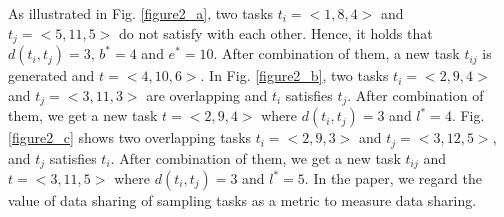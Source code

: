 \documentclass[prodmode,acmtosn]{acmsmall}
\begin{document}
As illustrated in Fig. \ref{figure2_a}, two tasks $t_i\mathrm{=<}1,8,4\mathrm{>}$ and $t_j\mathrm{=<}5,11,5\mathrm{>}$ do not satisfy with each other. Hence, it holds that $d(t_i,t_j)\mathrm{=}3$, $b^\ast\mathrm{=}4$ and $e^\ast\mathrm{=}10$. After combination of them, a new task $t_{ij}$ is generated and $t\mathrm{=<}4,10,6\mathrm{>}$. In Fig. \ref{figure2_b}, two tasks $t_i\mathrm{=<}2,9,4\mathrm{>}$ and $t_j\mathrm{=<}3,11,3\mathrm{>}$ are overlapping and $t_i$ satisfies $t_j$. After combination of them, we get a new task $t\mathrm{=<}2,9,4\mathrm{>}$ where $d(t_i,t_j)\mathrm{=}3$ and $l^\ast=4$. Fig. \ref{figure2_c} shows two overlapping tasks $t_i\mathrm{=<}2,9,3\mathrm{>}$ and $t_j\mathrm{=<}3,12,5\mathrm{>}$, and $t_j$ satisfies $t_i$. After combination of them, we get a new task $t_{ij}$ and  $t\mathrm{=<}3,11,5\mathrm{>}$ where $d(t_i,t_j)\mathrm{=}3$ and  $l^\ast\mathrm{=}5$. In the paper, we regard the value of data sharing of sampling tasks as a metric to measure data sharing.
\end{document}
